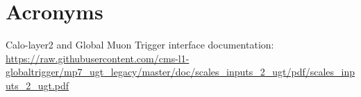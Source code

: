 \documentclass[11pt,a4paper,english,titlepage]{article}
\begin{document}
\doctitlepage{}



\doctoc{}



\doctables{}

\docfigures{}



\section*{Acronyms}
\begin{acronym}

\end{acronym}

\begin{thebibliography}{00}

Calo-layer2 and Global Muon Trigger interface documentation:\\
\url{https://raw.githubusercontent.com/cms-l1-globaltrigger/mp7_ugt_legacy/master/doc/scales_inputs_2_ugt/pdf/scales_inputs_2_ugt.pdf}

\end{thebibliography}


\end{document}
